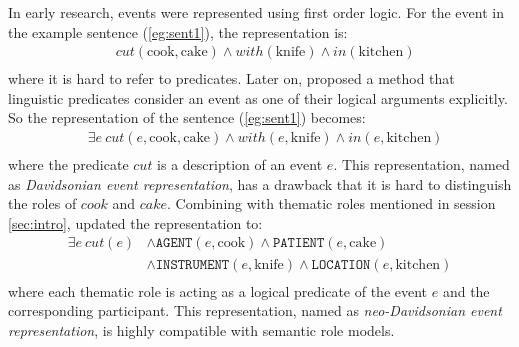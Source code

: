 \documentclass[a4paper]{article}
\begin{document}
In early research, events were represented using first order logic. For the event in the example sentence (\ref{eg:sent1}), the representation is:
\begin{equation*} \label{eg:fol}
\begin{aligned}
    & cut(\text{cook}, \text{cake}) \land with(\text{knife}) \land in(\text{kitchen}) \\
\end{aligned}
\end{equation*}
where it is hard to refer to predicates. Later on, \citet{davidson1967logical} proposed a method that linguistic predicates consider an event as one of their logical arguments explicitly. So the representation of the sentence (\ref{eg:sent1}) becomes: 
\begin{equation*} \label{eg:davidsonian}
\begin{aligned}
    & \exists e\ cut(e, \text{cook}, \text{cake}) \land with(e, \text{knife}) \land in(e, \text{kitchen}) \\
\end{aligned}
\end{equation*}
where the predicate $cut$ is a description of an event $e$. This representation, named as \textit{Davidsonian event representation}, has a drawback that it is hard to distinguish the roles of $cook$ and $cake$. Combining with thematic roles mentioned in session \ref{sec:intro}, \citet{parsons1990events} updated the representation to: 
\begin{equation} \label{eg:neodavidsonian}
\begin{aligned}
    \exists e\ cut(e)
    & \land \texttt{AGENT}(e, \text{cook}) \land \texttt{PATIENT}(e, \text{cake}) \\
    & \land \texttt{INSTRUMENT}(e, \text{knife}) \land \texttt{LOCATION}(e, \text{kitchen}) \\
\end{aligned}
\end{equation}
where each thematic role is acting as a logical predicate of the event $e$ and the corresponding participant. This representation, named as \textit{neo-Davidsonian event representation}, is highly compatible with semantic role models. 
% 
% 
\end{document}
